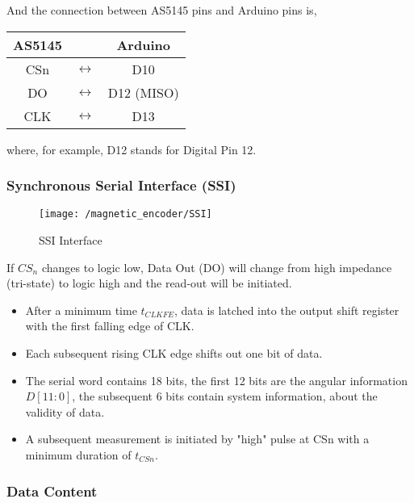 \noindent And the connection between AS5145 pins and Arduino pins is,


\begin{center}
	\begin{tabular}{|c c c|}
	\hline AS5145 & & \multicolumn{1}{c|}{Arduino}	\\
	\hline CSn	&	$\leftrightarrow$ &	D10 \\
	DO	&	$\leftrightarrow$ &	D12 (MISO) \\
	CLK	&	$\leftrightarrow$ &	D13	\\ \hline	
	\end{tabular}
\end{center}

\noindent where, for example, D12 stands for Digital Pin 12.


\subsubsection{Synchronous Serial Interface (SSI)}

\begin{figure}[h] \label{SSI AS5145}
	\begin{center}
		\texttt{[image: /magnetic\_encoder/SSI]}
		\caption{SSI Interface}
	\end{center}
\end{figure}

If $CS_n$ changes to logic low, Data Out (DO) will change from high impedance (tri-state) to logic high and the read-out will be initiated.

\begin{itemize}
	\item	After a minimum time $t_{CLK FE}$, data is latched into the output shift register with the first falling edge of CLK.
	\item Each subsequent rising CLK edge shifts out one bit of data.
	\item The serial word contains 18 bits, the first 12 bits are the angular information $D[11:0]$, the subsequent 6 bits contain system information, about the validity of data.
	\item A subsequent measurement is initiated by "high" pulse at CSn with a minimum duration of $t_{CSn}$.
\end{itemize}

\subsubsection{Data Content}

